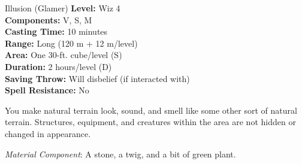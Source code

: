 {Illusion (Glamer)}
{
	\textbf{Level:}
	Wiz 4\\
	\textbf{Components:}
	V, S, M\\
	\textbf{Casting Time:}
	10 minutes\\
	\textbf{Range:}
	Long (120 m + 12 m/level)\\
	\textbf{Area:}
	One 30-ft. cube/level (S)\\
	\textbf{Duration:}
	2 hours/level (D)\\
	\textbf{Saving Throw:}
	Will disbelief (if interacted with)\\
	\textbf{Spell Resistance:}
	No\\
}
{
	You make natural terrain look, sound, and smell like some other sort of natural terrain. Structures, equipment, and creatures within the area are not hidden or changed in appearance.

	\textit{Material Component}:
	A stone, a twig, and a bit of green plant.

}
